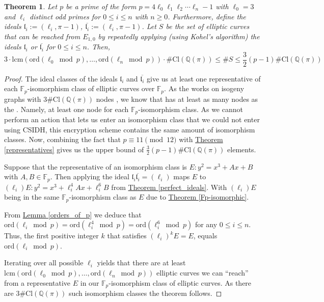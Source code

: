 \documentclass[openany, a4paper, 10pt]{book}
\theoremstyle{plain}
\newtheorem{theorem}{Theorem}[chapter]
\theoremstyle{plain}
\theoremstyle{plain}
\theoremstyle{definition}
\theoremstyle{plain}
\theoremstyle{definition}
\theoremstyle{remark}
\newcommand{\theoref}[1]{\hyperref[#1]{Theorem \ref{#1}}}
\newcommand{\lemref}[1]{\hyperref[#1]{Lemma \ref{#1}}}
\begin{document}
\begin{theorem}\label{num_repr}
    Let $p$ be a prime of the form $p=4\ell_0\ell_1\ell_2\cdots\ell_n-1$ with $\ell_0=3$ and $\ell_i$ distinct odd primes for $0 \leq i \leq n$ with $n \geq 0$.
    Furthermore, define the ideals $\mathfrak l_i := (\ell_i, \pi-1)$, $\overline{\mathfrak l_i} := (\ell_i, \pi-1)$.
    Let $S$ be the set of elliptic curves that can be reached from $E_{1,0}$ by repeatedly applying (using Kohel's algorithm) the ideals $\mathfrak l_i$ or $\overline{\mathfrak l_i}$ for $0 \leq i \leq n$.
    Then,
    \begin{equation*}
        3\cdot \mathrm{lcm}(\mathrm{ord}(\ell_0 \bmod p), \dots, \mathrm{ord}(\ell_n \bmod p))\cdot \#\mathrm{Cl}(\mathbb Q(\pi)) \leq \#S \leq \frac{3}{2}(p-1)\#\mathrm{Cl}(\mathbb Q(\pi))
    \end{equation*}
\end{theorem}
\begin{proof}
    The ideal classes of the ideals $\mathfrak l_i$ and $\overline{\mathfrak l_i}$ give us at least one representative of each $\mathbb F_p$-isomorphism class of elliptic curves over $\mathbb F_p$.
    As the  works on isogeny graphs with $3 \#\mathrm{Cl}(\mathbb Q(\pi))$ nodes \cite[Section~3]{CSIFISH}, we know that  has at least as many nodes as the .
    Namely, at least one node for each $\mathbb F_p$-isomorphism class.
    As we cannot perform an action that lets us enter an isomorphism class that we could not enter using CSIDH, this encryption scheme contains the same amount of isomorphism classes.
    Now, combining the fact that $p \equiv 11 \pmod {12}$ with \theoref{representatives} gives us the upper bound of $\frac{3}{2}(p-1)\#\mathrm{Cl}(\mathbb Q(\pi))$ elements.

    Suppose that the representative of an isomorphism class is $E: y^2 = x^3 + Ax + B$ with $A, B \in \mathbb F_p$.
    Then applying the ideal $\mathfrak l_i \overline{\mathfrak l_i} = (\ell_i)$ maps $E$ to $(\ell_i)E: y^2 = x^3 + \ell_i^4Ax + \ell_i^6B$ from \theoref{perfect_ideals}.
    With $(\ell_i)E$ being in the same $\mathbb F_p$-isomorphism class as $E$ due to \theoref{Fp-isomorphic}.

    From \lemref{orders_of_p} we deduce that $\mathrm{ord}(\ell_i \bmod p) = \mathrm{ord}(\ell_i^4 \bmod p) = \mathrm{ord}(\ell_i^6 \bmod p)$ for any $0 \leq i \leq n$.
    Thus, the first positive integer $k$ that satisfies $(\ell_i)^kE = E$, equals $\mathrm{ord}(\ell_i \bmod p)$.

    Iterating over all possible $\ell_i$ yields that there are at least $\mathrm{lcm}(\mathrm{ord}(\ell_0 \bmod p), \dots, \mathrm{ord}(\ell_n \bmod p))$ elliptic curves we can ``reach'' from a representative $E$ in our $\mathbb F_p$-isomorphism class of elliptic curves.
    As there are $3\#\mathrm{Cl}(\mathbb Q(\pi))$ such isomorphism classes the theorem follows.
\end{proof}
\end{document}
